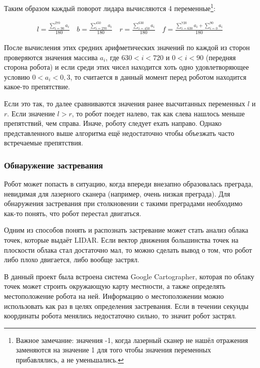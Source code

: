 Таким образом каждый поворот лидара вычисляются 4 переменные\footnote{Важное замечание: значения -1, когда лазерный сканер не нашёл отражения заменяются на значение 1 для того чтобы значения переменных прибавлялись, а не уменьшались.}:

\[
\begin{array}{c}
l = \frac{\displaystyle\sum_{i=90}^{270} a_i}{180} \quad
b = \frac{\displaystyle\sum_{i=270}^{450} a_i}{180}\quad
r = \frac{\displaystyle\sum_{i=450}^{630} a_i}{180} \quad
f = \frac{\displaystyle\sum_{i=630}^{720} a_i + \sum_{i=0}^{90} a_i}{180}
\end{array}
\]

После вычисления этих средних арифметических значений по каждой из сторон проверяются значения массива $a_i$, где $630 < i < 720$ и $0 < i < 90$ (передняя сторона робота) и если среди этих чисел находится хоть одно удовлетворяющее условию $0 < a_i < 0,3$, то считается в данный момент перед роботом находится какое-то препятствие.

Если это так, то далее сравниваются значения ранее высчитанных переменных $l$ и $r$. Если значение $l > r$, то робот поедет налево, так как слева нашлось меньше препятствий, чем справа. Иначе, роботу следует ехать направо. Однако представленного выше алгоритма ещё недостаточно чтобы объезжать часто встречаемые препятствия. 

\subsubsection{Обнаружение застревания}

Робот может попасть в ситуацию, когда впереди внезапно образовалась преграда, невидимая для лазерного сканера (например, очень низкая преграда). Для обнаружения застревания при столкновении с такими преградами необходимо как-то понять, что робот перестал двигаться. 

Одним из способов понять и распознать застревание может стать анализ облака точек, которые выдаёт LIDAR. Если вектор движения большинства точек на плоскости облака стал достаточно мал, то можно сделать вывод о том, что робот либо плохо двигается, либо вообще застрял. 

В данный проект была встроена система Google Cartographer, которая по облаку точек может строить окружающую карту местности, а также определять местоположение робота на ней. Информацию о местоположении можно использовать как раз в целях определения застревания. Если в течении секунды координаты робота менялись недостаточно сильно, то значит робот застрял.

